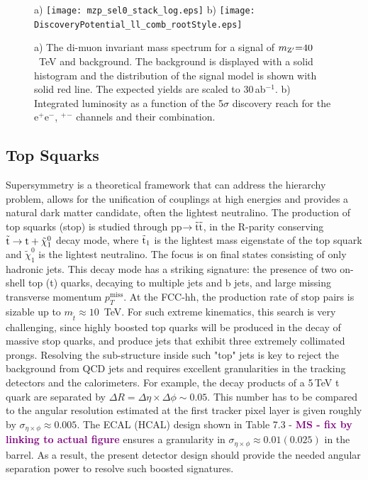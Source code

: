 \documentclass[11pt,twoside,a4paper]{cernrep}
\newcommand{\MS}[1]{\textbf{\textcolor{purple}{MS - #1}}}
\begin{document}
%
%
%
\begin{figure}
  \centering
  a)
  \texttt{[image: mzp\_sel0\_stack\_log.eps]}
  b)
  \texttt{[image: DiscoveryPotential\_ll\_comb\_rootStyle.eps]}
  \caption{a) The di-muon invariant mass spectrum for a signal of $m_{\rm Z^{\prime}} {=} 40$~TeV and background. The background is displayed with a solid histogram and the distribution of the signal model is shown with solid red line. The expected yields are scaled to 30\,ab$^{-1}$. b) Integrated luminosity as a function of the 5$\sigma$ discovery reach for the e$^+$e$^-$, \textmu$^+$\textmu$^-$ channels and their combination.}
  \label{zprime}
\end{figure}


\subsection{Top Squarks}

Supersymmetry is a theoretical framework that can address the hierarchy problem, allows for the unification of couplings at high energies and provides a natural dark matter candidate, often the lightest neutralino. The production of top squarks (stop) is studied through pp$\rightarrow \tilde{\rm t} \tilde{\rm t}$, in the R-parity conserving $\rm \tilde{t} \rightarrow t + \tilde{\chi}_1^{0}$ decay mode, where $\rm \tilde{t}_{1}$ is the lightest mass eigenstate of the top squark and $\tilde{\chi}_1^{0}$ is the lightest neutralino. The focus is on final states consisting of only hadronic jets. This decay mode has a striking signature: the presence of two on-shell top (t) quarks, decaying to multiple jets and b jets, and large missing transverse momentum $p_T^{\mathrm{miss}}$. At the FCC-hh, the production rate of stop pairs is sizable up to $m_{\tilde{t}} \approx 10$~TeV. For such extreme kinematics, this search is very challenging, since highly boosted top quarks will be produced in the decay of massive stop quarks, and produce jets that exhibit three extremely collimated prongs. Resolving the sub-structure inside such "top" jets is key to reject the background from QCD jets and requires excellent granularities in the tracking detectors and the calorimeters. For example, the decay products of a 5\,TeV t quark are separated by $\Delta R {=} \Delta \eta \times \Delta \phi \sim 0.05$. This number has to be compared to the angular resolution estimated at the first tracker pixel layer is given roughly by $\sigma_{\eta \times \phi} \approx 0.005$. The ECAL (HCAL) design shown in Table 7.3  - \MS{fix by linking to actual figure} ensures a granularity in $\sigma_{\eta \times \phi} \approx 0.01 (0.025)$ in the barrel. As a result, the present detector design should provide the needed angular separation power to resolve such boosted signatures.
\end{document}
